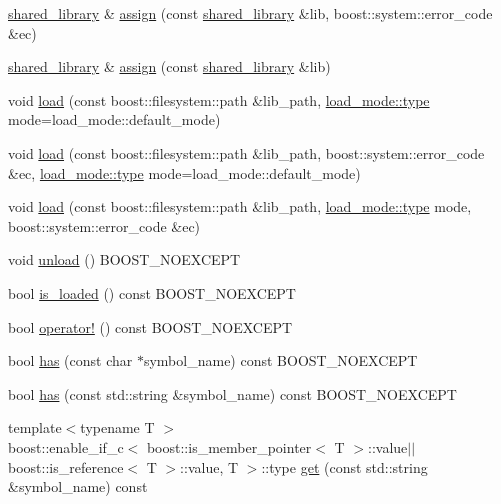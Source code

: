 \begin{DoxyCompactItemize}
\item 
\hyperlink{a01708}{shared\+\_\+library} \& \hyperlink{a01708_a2a721aaeab6fcb572362d002b3aceb7c}{assign} (const \hyperlink{a01708}{shared\+\_\+library} \&lib, boost\+::system\+::error\+\_\+code \&ec)
\item 
\hyperlink{a01708}{shared\+\_\+library} \& \hyperlink{a01708_abd3dd2379776454171c9846217abdec9}{assign} (const \hyperlink{a01708}{shared\+\_\+library} \&lib)
\item 
void \hyperlink{a01708_ae7df87e5b40963d6348a5962d9561f2e}{load} (const boost\+::filesystem\+::path \&lib\+\_\+path, \hyperlink{a00272_a1918a602801479bc0bade54ff5665129}{load\+\_\+mode\+::type} mode=load\+\_\+mode\+::default\+\_\+mode)
\item 
void \hyperlink{a01708_a6e8559f05d82d6e7f47beddd416cb734}{load} (const boost\+::filesystem\+::path \&lib\+\_\+path, boost\+::system\+::error\+\_\+code \&ec, \hyperlink{a00272_a1918a602801479bc0bade54ff5665129}{load\+\_\+mode\+::type} mode=load\+\_\+mode\+::default\+\_\+mode)
\item 
void \hyperlink{a01708_a7553f2922553fcf6e5e0564b0bbb93b8}{load} (const boost\+::filesystem\+::path \&lib\+\_\+path, \hyperlink{a00272_a1918a602801479bc0bade54ff5665129}{load\+\_\+mode\+::type} mode, boost\+::system\+::error\+\_\+code \&ec)
\item 
void \hyperlink{a01708_a0c01ab046e5dcabe4c10db2a28cbe33e}{unload} () B\+O\+O\+S\+T\+\_\+\+N\+O\+E\+X\+C\+E\+PT
\item 
bool \hyperlink{a01708_a31ec32c213665bd151f2c615f89f94ef}{is\+\_\+loaded} () const B\+O\+O\+S\+T\+\_\+\+N\+O\+E\+X\+C\+E\+PT
\item 
bool \hyperlink{a01708_ab790a042574a0df32b4fb424402e2d50}{operator!} () const B\+O\+O\+S\+T\+\_\+\+N\+O\+E\+X\+C\+E\+PT
\item 
bool \hyperlink{a01708_a450d2d74c10dfa790091880d0a95bc1d}{has} (const char $\ast$symbol\+\_\+name) const B\+O\+O\+S\+T\+\_\+\+N\+O\+E\+X\+C\+E\+PT
\item 
bool \hyperlink{a01708_a7f33a8cd84bf689a73ddeed81013bd79}{has} (const std\+::string \&symbol\+\_\+name) const B\+O\+O\+S\+T\+\_\+\+N\+O\+E\+X\+C\+E\+PT
\item 
{\footnotesize template$<$typename T $>$ }\\boost\+::enable\+\_\+if\+\_\+c$<$ boost\+::is\+\_\+member\+\_\+pointer$<$ T $>$\+::value$\vert$$\vert$boost\+::is\+\_\+reference$<$ T $>$\+::value, T $>$\+::type \hyperlink{a01708_a95aacb882bafadf535337c9c5cc0bea1}{get} (const std\+::string \&symbol\+\_\+name) const
$$
\end{DoxyCompactItemize}
